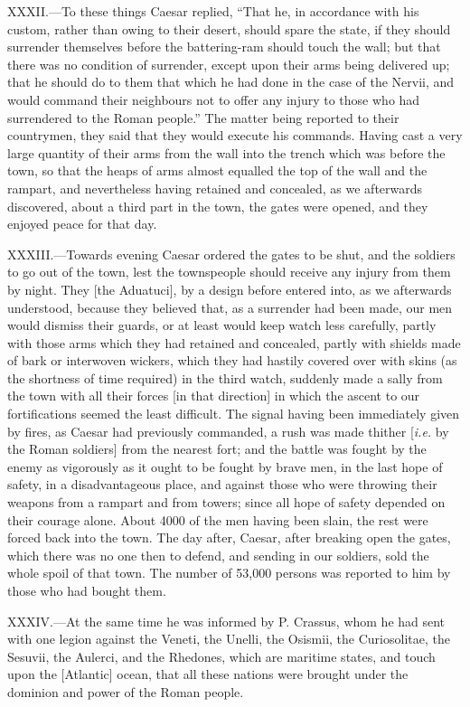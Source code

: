 XXXII.—To these things Caesar replied, ``That he, in accordance with his
custom, rather than owing to their desert, should spare the state, if
they should surrender themselves before the battering-ram should touch
the wall; but that there was no condition of surrender, except upon
their arms being delivered up; that he should do to them that which he
had done in the case of the Nervii, and would command their neighbours
not to offer any injury to those who had surrendered to the Roman
people.'' The matter being reported to their countrymen, they said that
they would execute his commands. Having cast a very large quantity of
their arms from the wall into the trench which was before the town, so
that the heaps of arms almost equalled the top of the wall and the
rampart, and nevertheless having retained and concealed, as we
afterwards discovered, about a third part in the town, the gates were
opened, and they enjoyed peace for that day.

XXXIII.—Towards evening Caesar ordered the gates to be shut, and the
soldiers to go out of the town, lest the townspeople should receive any
injury from them by night. They [the Aduatuci], by a design before
entered into, as we afterwards understood, because they believed that,
as a surrender had been made, our men would dismiss their guards, or at
least would keep watch less carefully, partly with those arms which they
had retained and concealed, partly with shields made of bark or
interwoven wickers, which they had hastily covered over with skins (as
the shortness of time required) in the third watch, suddenly made a
sally from the town with all their forces [in that direction] in which
the ascent to our fortifications seemed the least difficult. The signal
having been immediately given by fires, as Caesar had previously
commanded, a rush was made thither [\emph{i.e.} by the Roman soldiers] from
the nearest fort; and the battle was fought by the enemy as vigorously
as it ought to be fought by brave men, in the last hope of safety, in a
disadvantageous place, and against those who were throwing their weapons
from a rampart and from towers; since all hope of safety depended on
their courage alone. About 4000 of the men having been slain, the rest
were forced back into the town. The day after, Caesar, after breaking
open the gates, which there was no one then to defend, and sending in
our soldiers, sold the whole spoil of that town. The number of 53,000
persons was reported to him by those who had bought them.

XXXIV.—At the same time he was informed by P. Crassus, whom he had sent
with one legion against the Veneti, the Unelli, the Osismii, the
Curiosolitae, the Sesuvii, the Aulerci, and the Rhedones, which are
maritime states, and touch upon the [Atlantic] ocean, that all these
nations were brought under the dominion and power of the Roman people.

